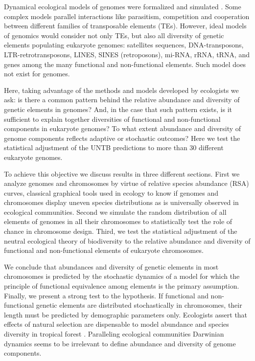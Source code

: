 Dynamical ecological models of genomes were formalized and simulated \cite{Abrusan2006,Leonardo2002,LeRouzic2007}. Some complex models parallel interactions like parasitism, competition and cooperation between different families of transposable elements (TEs). However, ideal models of genomics would consider not only TEs, but also all diversity of genetic elements populating eukaryote genomes: satellites sequences, DNA-transposons, LTR-\gls{retrotransposon}s, \gls{LINE}S, \gls{SINE}S (\gls{retroposon}s), mi-RNA, rRNA, tRNA, and genes among the many functional and non-functional elements. Such model does not exist for genomes.

Here, taking advantage of the methods and models developed by ecologists we ask: is there a common pattern behind the relative abundance and diversity of genetic elements in genomes? And, in the case that such pattern exists, is it sufficient to explain together diversities of  functional and non-functional components in eukaryote genomes? To what extent abundance and diversity of genome components reflects adaptive or stochastic outcomes? Here we test the statistical adjustment of the UNTB predictions to more than 30 different eukaryote genomes.

To achieve this objective we discuss results in three different sections. First we analyze genomes and chromosomes by virtue of relative species abundance (RSA) curves, classical graphical tools used in ecology to know if genomes and chromosomes display uneven species distributions as is universally observed in ecological communities. Second we simulate the random distribution of all elements of genomes in all their chromosomes to statistically test the role of chance in chromosome design. Third, we test the statistical adjustment of the neutral ecological theory of biodiversity to the relative abundance and diversity of functional and non-functional elements of eukaryote chromosomes.

We conclude that abundances and diversity of genetic elements in most chromosomes is predicted by the stochastic dynamics of a model for which the principle of functional equivalence among elements is the primary assumption. Finally, we present a strong test to the hypothesis. If functional and non-functional genetic elements are distributed stochastically in chromosomes, their length must be predicted by demographic parameters only. Ecologists assert that effects of natural selection are dispensable to model abundance and species diversity in tropical forest \cite{Jabot2011}. Paralleling ecological communities Darwinian dynamics seems to be irrelevant to define abundance and diversity of genome components.

